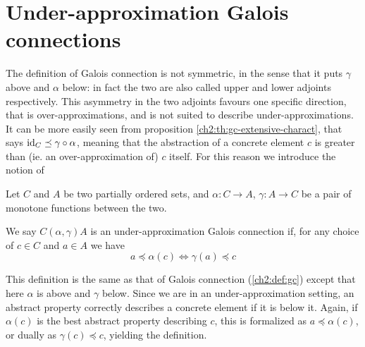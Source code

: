 \section{Under-approximation Galois connections}
The definition of Galois connection is not symmetric, in the sense that it puts $\gamma$ above and $\alpha$ below: in fact the two are also called upper and lower adjoints respectively. This asymmetry in the two adjoints favours one specific direction, that is over-approximations, and is not suited to describe under-approximations. It can be more easily seen from proposition \ref{ch2:th:gc-extensive-charact}, that says $\text{id}_C \preceq \gamma \circ \alpha$, meaning that the abstraction of a concrete element $c$ is greater than (ie. an over-approximation of) $c$ itself. For this reason we introduce the notion of
\begin{definition}\label{ch2:def:under-gc}
	Let $C$ and $A$ be two partially ordered sets, and $\alpha : C \rightarrow A$, $\gamma : A \rightarrow C$ be a pair of monotone functions between the two.

	We say $C (\alpha, \gamma) A$ is an under-approximation Galois connection if, for any choice of $c \in C$ and $a \in A$ we have
	\[
	a \preceq \alpha(c) \iff \gamma(a) \preceq c
	\]
\end{definition}
This definition is the same as that of Galois connection (\ref{ch2:def:gc}) except that here $\alpha$ is above and $\gamma$ below. Since we are in an under-approximation setting, an abstract property correctly describes a concrete element if it is below it. Again, if $\alpha(c)$ is the best abstract property describing $c$, this is formalized as $a \preceq \alpha(c)$, or dually as $\gamma(c) \preceq c$, yielding the definition.
